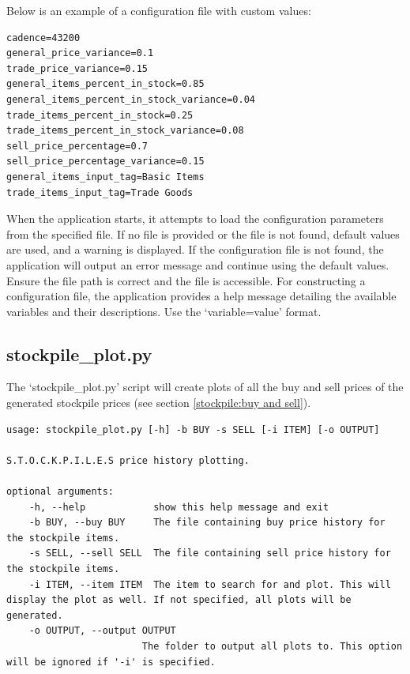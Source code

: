 Below is an example of a configuration file with custom values:

\begin{lstlisting}
cadence=43200
general_price_variance=0.1
trade_price_variance=0.15
general_items_percent_in_stock=0.85
general_items_percent_in_stock_variance=0.04
trade_items_percent_in_stock=0.25
trade_items_percent_in_stock_variance=0.08
sell_price_percentage=0.7
sell_price_percentage_variance=0.15
general_items_input_tag=Basic Items
trade_items_input_tag=Trade Goods
\end{lstlisting}

When the application starts, it attempts to load the configuration parameters from the specified file. If no file is provided or the file is not found, default values are used, and a warning is displayed. If the configuration file is not found, the application will output an error message and continue using the default values. Ensure the file path is correct and the file is accessible. For constructing a configuration file, the application provides a help message detailing the available variables and their descriptions. Use the `variable=value' format.









\subsection{stockpile\_plot.py}

The `stockpile\_plot.py' script will create plots of all the buy and sell prices of the generated stockpile prices (see section \ref{stockpile:buy and sell}).

\begin{lstlisting}
usage: stockpile_plot.py [-h] -b BUY -s SELL [-i ITEM] [-o OUTPUT]

S.T.O.C.K.P.I.L.E.S price history plotting.

optional arguments:
	-h, --help            show this help message and exit
	-b BUY, --buy BUY     The file containing buy price history for the stockpile items.
	-s SELL, --sell SELL  The file containing sell price history for the stockpile items.
	-i ITEM, --item ITEM  The item to search for and plot. This will display the plot as well. If not specified, all plots will be generated.
	-o OUTPUT, --output OUTPUT
	                    The folder to output all plots to. This option will be ignored if '-i' is specified.
\end{lstlisting}




